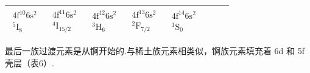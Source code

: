 \begin{center}
\begin{tabular}{|c||c|c|c|c|c|c|c|}
$\begin{array}{c}4\mathrm{f}^{10}6\mathrm{s}^{2}\\{}^{5}\mathrm{I}_{8}\end{array}$ &
$\begin{array}{c}4\mathrm{f}^{11}6\mathrm{s}^{2}\\{}^{4}\mathrm{I}_{15/2}\end{array}$ &
$\begin{array}{c}4\mathrm{f}^{12}6\mathrm{s}^{2}\\{}^{3}\mathrm{H}_{6}\end{array}$ &
$\begin{array}{c}4\mathrm{f}^{13}6\mathrm{s}^{2}\\{}^{2}\mathrm{F}_{7/2}\end{array}$ &
$\begin{array}{c}4\mathrm{f}^{14}6\mathrm{s}^{2}\\{}^{1}\mathrm{S}_{0}\end{array}$\\
\hline
\end{tabular}
\end{center}

最后一族过渡元素是从锕开始的.与稀土族元素相类似，锕族元素填充着 6d 和 5f 壳层（表6\mbox{）.}


